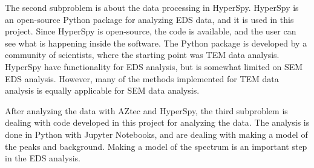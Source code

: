 \begin{center}
    \vspace*{0.2cm}

    \vspace*{0.2cm}
\end{center}



The second subproblem is about the data processing in HyperSpy.
HyperSpy is an open-source Python package for analyzing EDS data, and it is used in this project.
Since HyperSpy is open-source, the code is available, and the user can see what is happening inside the software.
The Python package is developed by a community of scientists, where the starting point was TEM data analysis.
HyperSpy have functionality for EDS analysis, but is somewhat limited on SEM EDS analysis.
However, many of the methods implemented for TEM data analysis is equally applicable for SEM data analysis.

\begin{center}
    \vspace*{0.2cm}

    \vspace*{0.2cm}
\end{center}




After analyzing the data with AZtec and HyperSpy, the third subproblem is dealing with code developed in this project for analyzing the data.
The analysis is done in Python with Jupyter Notebooks, and are dealing with making a model of the peaks and background.
Making a model of the spectrum is an important step in the EDS analysis.

